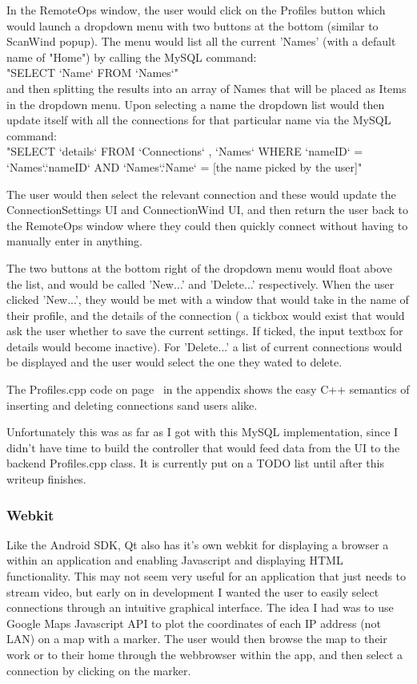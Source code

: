 In the RemoteOps window, the user would click on the Profiles button which would launch a dropdown menu with two buttons at the bottom (similar to ScanWind popup). The menu would list all the current 'Names' (with a default name of "Home") by calling the MySQL command:\\
\tab"SELECT `Name` FROM `Names`"\\
and then splitting the results into an array of Names that will be placed as Items in the dropdown menu. Upon selecting a name the dropdown list would then update itself with all the connections for that particular name via the MySQL command:\\
\tab"SELECT `details` FROM `Connections` , `Names` WHERE `nameID` = `Names`.`nameID` AND `Names`.`Name` =  [the name picked by the user]"

The user would then select the relevant connection and these would update the ConnectionSettings UI and ConnectionWind UI, and then return the user back to the RemoteOps window where they could then quickly connect without having to manually enter in anything.

The two buttons at the bottom right of the dropdown menu would float above the list, and would be called 'New...' and 'Delete...' respectively. When the user clicked 'New...', they would be met with a window that would take in the name of their profile, and the details of the connection ( a tickbox would exist that would ask the user whether to save the current settings. If ticked, the input textbox for details would become inactive).  For 'Delete...' a list of current connections would be displayed and the user would select the one they wated to delete.

The Profiles.cpp code on page~\pageref{profiles} in the appendix shows the easy C++ semantics of inserting and deleting connections sand users alike.

Unfortunately this was as far as I got with this MySQL implementation, since I didn't have time to build the controller that would feed data from the UI to the backend Profiles.cpp class. It is currently put on a TODO list until after this writeup finishes.

\subsubsection{Webkit}
Like the Android SDK, Qt also has it's own webkit for displaying a browser a within an application and enabling Javascript and displaying HTML  functionality. This may not seem very useful for an application that just needs to stream video, but early on in development I wanted the user to easily select connections through an intuitive graphical interface.
The idea I had was to use Google Maps Javascript API to plot the coordinates of each IP address (not LAN) on a map with a marker. The user would then browse the map to their work or to their home through the webbrowser within the app, and then select a connection by clicking on the marker.

